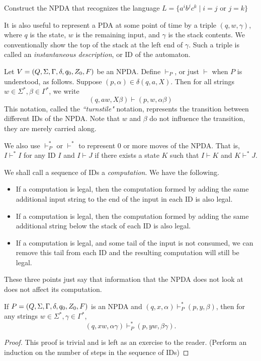 \begin{exercise}
Construct the NPDA that recognizes the language $L=\{a^ib^jc^k\mid i=j\text{ or }j=k\}$
\end{exercise}

It is also useful to represent a PDA at some point of time by a triple $(q,w,\gamma)$, where $q$ is the state, $w$ is the remaining input, and $\gamma$ is the stack contents. We conventionally show the top of the stack at the left end of $\gamma$. Such a triple is called an \textit{instantaneous description}, or ID of the automaton.

\vspace{3mm}
Let $V=(Q,\Sigma,\Gamma,\delta,q_0,Z_0,F)$ be an NPDA. Define $\vdash_P$, or just $\vdash$ when $P$ is understood, as follows. Suppose $(p,\alpha)\in\delta(q,a,X)$. Then for all strings $w\in\Sigma^*,\beta\in\Gamma^*$, we write
$$(q,aw,X\beta)\vdash(p,w,\alpha\beta)$$
This notation, called the \textit{``turnstile"} notation, represents the transition between different IDs of the NPDA. Note that $w$ and $\beta$ do not influence the transition, they are merely carried along.

We also use $\vdash^*_P$ or $\vdash^*$ to represent $0$ or more moves of the NPDA. That is, $I\vdash^* I$ for any ID $I$ and $I\vdash J$ if there exists a state $K$ such that $I\vdash K$ and $K\vdash^* J$.

\vspace{3mm}
We shall call a sequence of IDs a \textit{computation}. We have the following.
\begin{itemize}
    \item If a computation is legal, then the computation formed by adding the same additional input string to the end of the input in each ID is also legal.
    \item If a computation is legal, then the computation formed by adding the same additional string below the stack of each ID is also legal.
    \item If a computation is legal, and some tail of the input is not consumed, we can remove this tail from each ID and the resulting computation will still be legal.
\end{itemize}

These three points just say that information that the NPDA does not look at does not affect its computation.

\begin{theorem}
\label{dontreaddontcare}
If $P=(Q,\Sigma,\Gamma,\delta,q_0,Z_0,F)$ is an NPDA and $(q,x,\alpha)\vdash^*_P(p,y,\beta)$, then for any strings $w\in\Sigma^*, \gamma\in\Gamma^*$, $$(q,xw,\alpha\gamma)\vdash^*_P(p,yw,\beta\gamma).$$
\end{theorem}
\begin{proof}
This proof is trivial and is left as an exercise to the reader. (Perform an induction on the number of steps in the sequence of IDs)
\end{proof}

